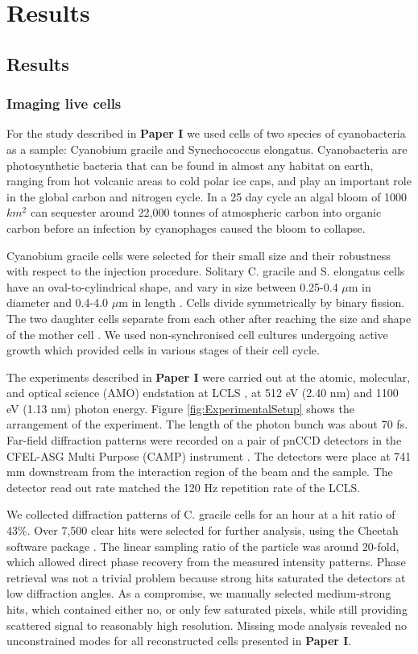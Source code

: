 \part{Results}
\chapter{Results}
\section{Imaging live cells}
For the study described in \textbf{Paper I} we used cells of two species of cyanobacteria as a sample: Cyanobium gracile and Synechococcus elongatus. Cyanobacteria are photosynthetic bacteria that can be found in almost any habitat on earth, ranging from hot volcanic areas to cold polar ice caps, and play an important role in the global carbon and nitrogen cycle. In a 25 day cycle an algal bloom of 1000 $km^2$ can sequester around 22,000 tonnes of atmospheric carbon into organic carbon before an infection by cyanophages caused the bloom to collapse.
 
Cyanobium gracile cells were selected for their small size and their robustness with respect to the injection procedure. Solitary C. gracile and S. elongatus cells have an oval-to-cylindrical shape, and vary in size between 0.25-0.4 $\mu$m in diameter and 0.4-4.0 $\mu$m in length \cite{Komarek1999}. Cells divide symmetrically by binary fission. The two daughter cells separate from each other after reaching the size and shape of the mother cell \cite{Bazire1988}. We used non-synchronised cell cultures undergoing active growth which provided cells in various stages of their cell cycle. 

The experiments described in \textbf{Paper I} were carried out at the atomic, molecular, and optical science (AMO) endstation at LCLS \cite{Bostedt2013}, at 512 eV (2.40 nm) and 1100 eV (1.13 nm) photon energy.  Figure \ref{fig:ExperimentalSetup} shows the arrangement of the experiment. The length of the photon bunch was about 70 fs. Far-field diffraction patterns were recorded on a pair of pnCCD detectors \cite{Struder2010} in the CFEL-ASG Multi Purpose (CAMP) instrument \cite{Struder2010}. The detectors were place at 741 mm downstream from the interaction region of the beam and the sample. The detector read out rate matched the 120 Hz repetition rate of the LCLS. 

We collected diffraction patterns of C. gracile cells for an hour at a hit ratio of 43\%. Over 7,500 clear hits were selected for further analysis, using the Cheetah software package \cite{Barty2014}. The linear sampling ratio of the particle was around 20-fold, which allowed direct phase recovery from the measured intensity patterns. Phase retrieval was not a trivial problem because strong hits saturated the detectors at low diffraction angles. As a compromise, we manually selected medium-strong hits, which contained either no, or only few saturated pixels, while still providing scattered signal to reasonably high resolution. Missing mode analysis revealed no unconstrained modes for all reconstructed cells presented in \textbf{Paper I}. 

